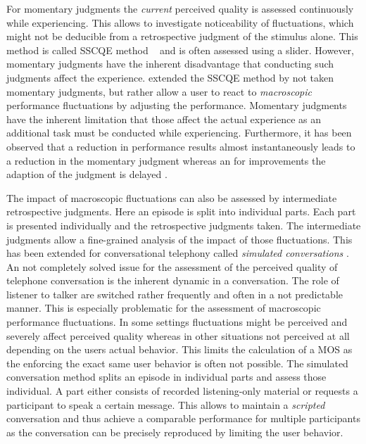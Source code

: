 For momentary judgments the \emph{current} perceived quality is assessed continuously while experiencing.
This allows to investigate noticeability of fluctuations, which might not be deducible from a retrospective judgment of the stimulus alone.
This method is called \ac{SSCQE} method ~\citep[][p. 137]{weiss_temporal_2014} and is often assessed using a slider.
However, momentary judgments have the inherent disadvantage that conducting such judgments affect the experience.
\citet{borowiak_long_2013} extended the \ac{SSCQE} method by not taken momentary judgments, but rather allow a user to react to \emph{macroscopic} performance fluctuations by adjusting the performance.
Momentary judgments have the inherent limitation that those affect the actual experience as an additional task must be conducted while experiencing.
Furthermore, it has been observed that a reduction in performance results almost instantaneously leads to a reduction in the momentary judgment whereas an for improvements the adaption of the judgment is delayed
\cite[\eg,][]{hands_recency_2001, weiss_temporal_2014, hamberg_time-varying_1999}.

The impact of macroscopic fluctuations can also be assessed by intermediate retrospective judgments.
Here an episode is split into individual parts.
Each part is presented individually and the retrospective judgments taken.
The intermediate judgments allow a fine-grained analysis of the impact of those fluctuations.
This has been extended for conversational telephony called \emph{simulated conversations} \citep{berger_estimation_2008}.
An not completely solved issue for the assessment of the perceived quality of telephone conversation is the inherent dynamic in a conversation.
The role of listener to talker are switched rather frequently and often in a not predictable manner.
This is especially problematic for the assessment of macroscopic performance fluctuations.
In some settings fluctuations might be perceived and severely affect perceived quality whereas in other situations not perceived at all depending on the users actual behavior.
This limits the calculation of a \ac{MOS} as the enforcing the exact same user behavior is often not possible.
The simulated conversation method splits an episode in individual parts and assess those individual.
A part either consists of recorded listening-only material or requests a participant to speak a certain message.
This allows to maintain a \emph{scripted} conversation and thus achieve a comparable performance for multiple participants as the conversation can be precisely reproduced by limiting the user behavior.

